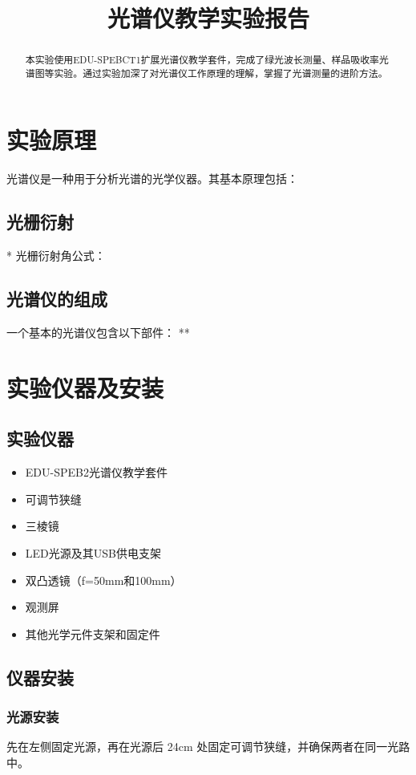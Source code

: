 \documentclass{ctexart}
\title{光谱仪教学实验报告}
\begin{document}
\maketitle

\begin{abstract}
本实验使用EDU-SPEBCT1扩展光谱仪教学套件，完成了绿光波长测量、样品吸收率光谱图等实验。通过实验加深了对光谱仪工作原理的理解，掌握了光谱测量的进阶方法。
\end{abstract}

\section{实验原理}

光谱仪是一种用于分析光谱的光学仪器。其基本原理包括：

\subsection{光栅衍射}
* 光栅衍射角公式：

\subsection{光谱仪的组成}
一个基本的光谱仪包含以下部件：
**

\section{实验仪器及安装}
\subsection{实验仪器}
\begin{itemize}
    \item EDU-SPEB2光谱仪教学套件
    \item 可调节狭缝
    \item 三棱镜
    \item LED光源及其USB供电支架
    \item 双凸透镜（f=50mm和100mm）
    \item 观测屏
    \item 其他光学元件支架和固定件
\end{itemize}
\subsection{仪器安装}
\subsubsection{光源安装}
先在左侧固定光源，再在光源后 24cm 处固定可调节狭缝，并确保两者在同一光路中。
\end{document}
